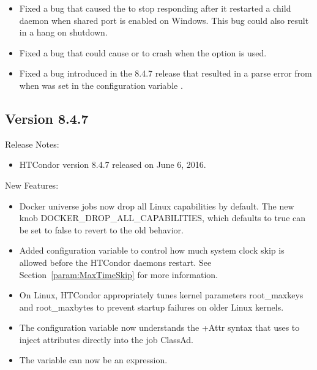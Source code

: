 \begin{itemize}
\item Fixed a bug that caused the  to stop responding after it
restarted a child daemon when shared port is enabled on Windows. This bug could also
result in a hang on shutdown.

\item Fixed a bug that could cause  or  to
crash when the  option is used.

\item Fixed a bug introduced in the 8.4.7 release that resulted in a parse error from 
when  was set in the configuration variable .

\end{itemize}

\subsection*{\label{sec:New-8-4-7}Version 8.4.7}

\noindent Release Notes:

\begin{itemize}

\item HTCondor version 8.4.7 released on June 6, 2016.

\end{itemize}


\noindent New Features:

\begin{itemize}

\item Docker universe jobs now drop all Linux capabilities by default.
The new knob DOCKER\_DROP\_ALL\_CAPABILITIES, which defaults to true
can be set to false to revert to the old behavior.

\item Added configuration variable  to control 
	how much system clock skip is allowed before the HTCondor daemons
	restart.  See Section~\ref{param:MaxTimeSkip} for more information.

\item On Linux, HTCondor appropriately tunes kernel parameters
root\_maxkeys and root\_maxbytes to prevent  
startup failures on older Linux kernels.

\item The configuration variable  now understands the +Attr
syntax that  uses to inject attributes directly into the job ClassAd.

\item The  variable  can now be an
expression.

\end{itemize}

